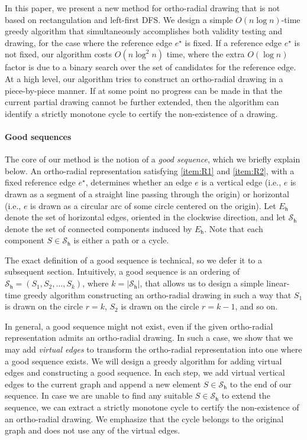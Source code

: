 \documentclass{article}\usepackage[a4paper,margin=20mm]{geometry}
\newcommand{\EH}{E_\mathsf{h}}
\newcommand{\PH}{\mathcal{S}_\mathsf{h}}
\newcommand{\eref}{e^\star}
\begin{document}
In this paper, we present a new method for ortho-radial drawing that is not based on rectangulation and left-first DFS. 
We design a simple $O(n \log n)$-time greedy algorithm that simultaneously accomplishes both validity testing and drawing, for the case where the reference edge $\eref$ is fixed. If a reference edge $\eref$ is not fixed, our algorithm costs $O(n \log^2 n)$ time, where the extra $O(\log n)$ factor is due to a binary search over the set of  candidates for the reference edge.
 At a high level, our algorithm tries to construct an ortho-radial drawing in a piece-by-piece manner. If at some point no progress can be made in that the current partial drawing cannot be further extended, then the algorithm can identify a strictly monotone cycle to certify the non-existence of a drawing. 
 
 \paragraph{Good sequences} The core of our method is the notion of a \emph{good sequence}, which we briefly explain below. An ortho-radial representation satisfying \ref{item:R1} and \ref{item:R2}, with a fixed reference edge $\eref$, determines whether an edge $e$ is a vertical edge (i.e., $e$ is drawn as a  segment of  a straight line passing through the origin) or  horizontal  (i.e., $e$ is drawn as a circular arc of some circle
centered on the origin). Let $\EH$ denote the set of horizontal edges, oriented in the clockwise direction, and let $\PH$ denote the set of connected components induced by $\EH$. Note that each component $S \in \PH$ is either a path or a cycle.

The exact definition of a good sequence is technical, so we defer it to a subsequent section. Intuitively, a good sequence is  an ordering of $\PH=(S_1, S_2, \ldots, S_{k})$, where $k = |\PH|$, that allows us to design
a simple linear-time greedy algorithm constructing an ortho-radial drawing in such a way that $S_1$ is drawn on the circle $r=k$, $S_2$ is drawn on the circle $r = k-1$, and so on. 
 
In general, a good sequence might not exist, even if the given ortho-radial representation admits an ortho-radial drawing. In such a case, we show that we may add \emph{virtual edges} to transform the ortho-radial representation into one where a good sequence exists. 
We will design a greedy algorithm for adding virtual edges and constructing a good sequence. In each step, we add virtual vertical edges to the current graph and append a new element $S \in \PH$ to the end of our sequence. In case we are unable to find any suitable $S \in \PH$ to extend the sequence, we can extract a strictly monotone cycle to certify the non-existence of an ortho-radial drawing. We emphasize that the cycle belongs to the original graph and does not use any of the virtual edges.
\end{document}
